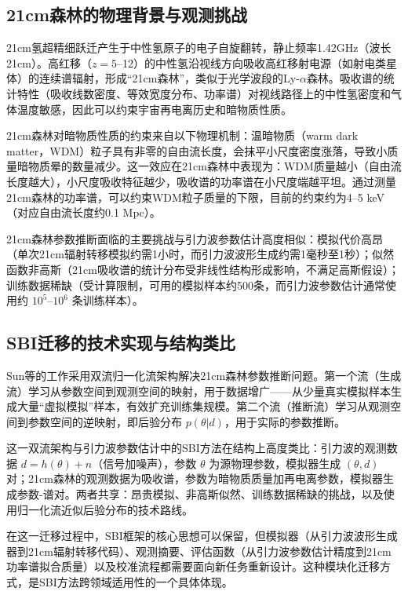 \subsection{21cm森林的物理背景与观测挑战}

21cm氢超精细跃迁产生于中性氢原子的电子自旋翻转，静止频率1.42GHz（波长21cm）。高红移（$z=5$--12）的中性氢沿视线方向吸收高红移射电源（如射电类星体）的连续谱辐射，形成“21cm森林”，类似于光学波段的Ly-$\alpha$森林。吸收谱的统计特性（吸收线数密度、等效宽度分布、功率谱）对视线路径上的中性氢密度和气体温度敏感，因此可以约束宇宙再电离历史和暗物质性质。

21cm森林对暗物质性质的约束来自以下物理机制：温暗物质（warm dark matter，WDM）粒子具有非零的自由流长度，会抹平小尺度密度涨落，导致小质量暗物质晕的数量减少。这一效应在21cm森林中表现为：WDM质量越小（自由流长度越大），小尺度吸收特征越少，吸收谱的功率谱在小尺度端越平坦。通过测量21cm森林的功率谱，可以约束WDM粒子质量的下限，目前的约束约为4--5 keV（对应自由流长度约0.1 Mpc）。

21cm森林参数推断面临的主要挑战与引力波参数估计高度相似：模拟代价高昂（单次21cm辐射转移模拟约需1小时，而引力波波形生成约需1毫秒至1秒）；似然函数非高斯（21cm吸收谱的统计分布受非线性结构形成影响，不满足高斯假设）；训练数据稀缺（受计算限制，可用的模拟样本约500条，而引力波参数估计通常使用约 $10^5$--$10^6$ 条训练样本）。

\subsection{SBI迁移的技术实现与结构类比}

Sun等的工作采用双流归一化流架构解决21cm森林参数推断问题。第一个流（生成流）学习从参数空间到观测空间的映射，用于数据增广——从少量真实模拟样本生成大量“虚拟模拟”样本，有效扩充训练集规模。第二个流（推断流）学习从观测空间到参数空间的逆映射，即后验分布 $p(\theta|d)$，用于实际的参数推断。

这一双流架构与引力波参数估计中的SBI方法在结构上高度类比：引力波的观测数据 $d = h(\theta) + n$（信号加噪声），参数 $\theta$ 为源物理参数，模拟器生成 $(\theta, d)$ 对；21cm森林的观测数据为吸收谱，参数为暗物质质量加再电离参数，模拟器生成参数-谱对。两者共享：昂贵模拟、非高斯似然、训练数据稀缺的挑战，以及使用归一化流近似后验分布的技术路线。

在这一迁移过程中，SBI框架的核心思想可以保留，但模拟器（从引力波波形生成器到21cm辐射转移代码）、观测摘要、评估函数（从引力波参数估计精度到21cm功率谱拟合质量）以及校准流程都需要面向新任务重新设计。这种模块化迁移方式，是SBI方法跨领域适用性的一个具体体现。

